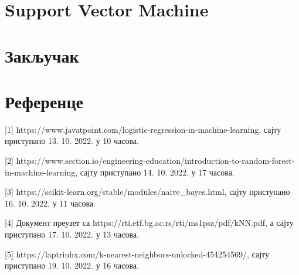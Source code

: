 \documentclass[11pt]{article} %
\begin{document}
\section{Support Vector Machine}
\section{Закључак}
\newpage
\section{Референце}
[1] https://www.javatpoint.com/logistic-regression-in-machine-learning, сајту приступано 13. 10. 2022. у 10 часова.

[2] https://www.section.io/engineering-education/introduction-to-random-forest-in-machine-learning, сајту приступано 14. 10. 2022. у 17 часова.

[3] https://scikit-learn.org/stable/modules/naive\_bayes.html, сајту приступано 16. 10. 2022. у 11 часова.

[4] Документ преузет са https://rti.etf.bg.ac.rs/rti/ms1psz/pdf/kNN.pdf, а сајту приступано 17. 10. 2022. у 13 часова.

[5] https://laptrinhx.com/k-nearest-neighbors-unlocked-454254569/, сајту приступано 19. 10. 2022. у 16 часова.
\end{document}
